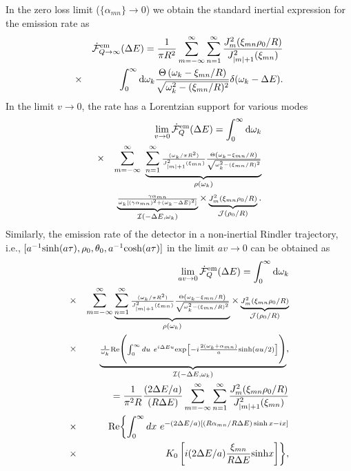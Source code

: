 \documentclass[aps,prl,nofootinbib,preprintnumbers,floatfix,twocolumn,superscriptaddress]{revtex4}
\def\nn{\nonumber}
\def\nn{\nonumber}
\def\l{\left}
\def\r{\right}
\def\d{{\rm d}}
\def\f{\frac}
\begin{document}
In the zero loss limit ($\{\alpha_{mn}\} \to 0$) we obtain the standard inertial expression for the emission rate as 
\begin{eqnarray}
 &&{\dot {\cal F}}^{\text{em}}_{Q\to \infty}(\Delta E)= 
 \f{1}{\pi R^2} \sum_{m=-\infty}^{\infty} \sum_{n=1}^{\infty}
 \f{J_{m}^2(\xi_{mn} \rho_0/R)}{J^2_{|m|+1}(\xi_{mn})} \nn \\  
 &\times&\int_{0}^{\infty} \d \omega_k \f{\Theta\l(\omega_k-\xi_{mn}/R\r)}{\sqrt{\omega_k^2-(\xi_{mn}/R)^2}} 
 \delta(\omega_k-\Delta E). 
\end{eqnarray}
In the limit $v\to 0$, the rate has a Lorentzian support for various modes
\begin{eqnarray}
 &&\lim_{v\to 0} {\dot {\cal F}}^{\text{em}}_Q(\Delta E)= 
 \int_{0}^{\infty} \d \omega_{k} \nn \\
 &\times&\sum_{m=-\infty}^{\infty} ~ 
 \underbrace{\sum_{n=1}^{\infty} {\scriptstyle \f{(\omega_k/\pi R^2)}{J^2_{|m|+1}(\xi_{mn})}
 \f{\Theta\l(\omega_k-\xi_{mn}/R\r)}{\sqrt{\omega_k^2-(\xi_{mn}/R)^2}}}}_{\rho(\omega_{k})} \nn \\ 
 &&\underbrace{{\scriptstyle \f{\gamma\alpha_{mn}}{\omega_k[(\gamma\alpha_{mn})^2 
  +(\omega_k-\Delta E)^2]}}}_{{\cal I}(-\Delta E,\omega_{k})} \times 
 \underbrace{{\scriptstyle J_{m}^2(\xi_{mn} \rho_0/R)}}
 _{{\cal J}(\rho_0/R)}. 
\end{eqnarray}
Similarly, the emission rate of the detector in a non-inertial Rindler trajectory, i.e., 
$[a^{-1} {\rm sinh}(a\tau),\rho_0,\theta_0,a^{-1} {\rm cosh}(a\tau)]$ in the limit $av\to0$ can be obtained as 
\begin{eqnarray}
 &&\lim_{av \to 0} {\dot {\cal F}}^{\text{em}}_Q(\Delta E)=\int_{0}^{\infty} \d \omega_{k}  \nn \\ 
 &\times&\sum_{m=-\infty}^{\infty} 
 \underbrace{\sum_{n=1}^{\infty} {\scriptstyle \f{(\omega_k/\pi R^2)}{J^2_{|m|+1}(\xi_{mn})} 
 \f{\Theta\l(\omega_k-\xi_{mn}/R\r)}{\sqrt{\omega_k^2-(\xi_{mn}/R)^2}}}}_{\rho(\omega_{k})} 
 \times\underbrace{{\scriptstyle J_{m}^2(\xi_{mn} \rho_0/R)}}_{{\cal J}(\rho_0/R)} \nn \\ 
 &\times&\underbrace{{\scriptstyle \frac{1}{\omega_k} 
 \text{Re}\Biggl(\int_{0}^{\infty} du~e^{i\Delta E u} 
 {\rm exp}\left[-i\f{2(\omega_k +\alpha_{mn})}{a} {\rm sinh}(au/2)\right]\Biggr)}}_{{\cal I}(-\Delta E,\omega_{k})}, \\ 
 &&=\f{1}{\pi^2 R} \f{(2\Delta E/a)}{(R\Delta E)} \sum_{m=-\infty}^{\infty} \sum_{n=1}^{\infty}
 \f{J_{m}^2(\xi_{mn} \rho_0/R)}{J^2_{|m|+1}(\xi_{mn})} \nn \\
 &\times&\text{Re}\biggl\{\int_{0}^{\infty} dx~e^{-(2\Delta E/a)\l[(R\alpha_{mn}/R\Delta E) \sinh x-ix\r]} \nn \\ 
 &\times&K_0\l[i(2\Delta E/a)\f{\xi_{mn}}{R\Delta E} {\rm sinh}x\r]\biggr\}, \label{UnruhCavityLoss} 
\end{eqnarray}
\end{document}
